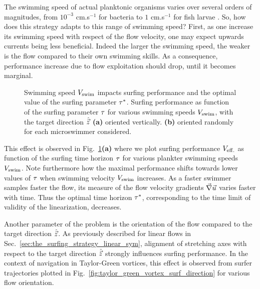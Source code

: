 The swimming speed of actual planktonic organisms varies over several orders of magnitudes, from $10^{-3}$ cm.s$^{-1}$ for bacteria to $1$ cm.s$^{-1}$ for fish larvae \citep{peters2000effects, fuchs2016seascape}.
So, how does this strategy adapts to this range of swimming speed?
First, as one increase its swimming speed with respect of the flow velocity, one may expect upwards currents being less beneficial.
Indeed the larger the swimming speed, the weaker is the flow compared to their own swimming skills.
As a consequence, performance increase due to flow exploitation should drop, until it becomes marginal.
\begin{figure}%
	\centering
	
	\caption[Swimming speed $\SwimmingVelocity$ impacts surfing performance and the optimal value of the surfing parameter $\TimeHorizonOpt$.]{
		Swimming speed $\SwimmingVelocity$ impacts surfing performance and the optimal value of the surfing parameter $\TimeHorizonOpt$.
		Surfing performance as function of the surfing parameter $\tau$ for various swimming speeds $\SwimmingVelocity$, with the target direction $\hat{\vec{z}}$
		\textbf{(a)} oriented vertically.
		\textbf{(b)} oriented randomly for each microswimmer considered.
	}
	\label{fig:taylor_green_vortex_tau_performance_vs_and_rdir}
\end{figure}

This effect is observed in Fig.~\ref{fig:taylor_green_vortex_tau_performance_vs_and_rdir}\textbf{(a)} where we plot surfing performance $V_{\mathrm{eff.}}$ as function of the surfing time horizon $\tau$ for various plankter swimming speeds $\SwimmingVelocity$.
Note furthermore how the maximal performance shifts towards lower values of $\tau$ when swimming velocity $\SwimmingVelocity$ increases.
As a faster swimmer samples faster the flow, its measure of the flow velocity gradients $\vec{\nabla} \vec{u}$ varies faster with time.
Thus the optimal time horizon $\TimeHorizonOpt$, corresponding to the time limit of validity of the linearization, decreases.


Another parameter of the problem is the orientation of the flow compared to the target direction $\hat{\vec{z}}$.
As previously described for linear flows in Sec.~\ref{sec:the_surfing_strategy_linear_sym}, alignment of stretching axes with respect to the target direction $\hat{\vec{z}}$ strongly influences surfing performance.
In the context of navigation in Taylor-Green vortices, this effect is observed from surfer trajectories plotted in Fig.~\ref{fig:taylor_green_vortex_surf_direction} for various flow orientation.

